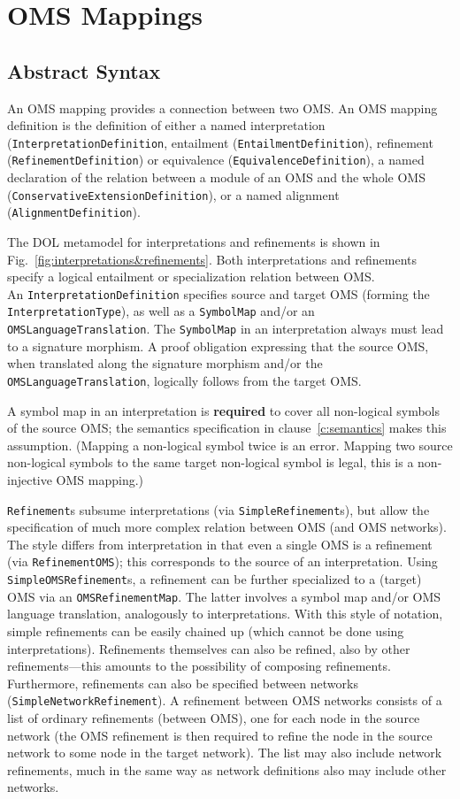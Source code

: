\documentclass[10pt,fleqn,final]{scrreprt}
\newcommand*{\termref}[1]{\index{#1}#1\xspace}
\newcommand*{\syntax}[1]{\texttt{#1}}
\newcommand*{\required}{\textbf{required}\xspace}
\newcommand{\clauserefname}{clause}
\newcommand{\cref}[1]{\clauserefname~\ref{#1}}
\newcommand{\sclause}[1]{\section{#1}}
\newcommand{\ssclause}[1]{\subsection{#1}}
\newenvironment{definitions}[0]{\medskip }{}
\begin{document}
\begin{definitions}


\sclause{OMS Mappings}\label{c:oms-mappings}
\ssclause{Abstract Syntax}


An OMS mapping provides a connection between two OMS. An OMS mapping
definition is the definition of either a named interpretation
(\syntax{InterpretationDefinition}, entailment (\syntax{EntailmentDefinition}),
refinement (\syntax{RefinementDefinition}) or equivalence
(\syntax{EquivalenceDefinition}), a named declaration of the relation
between a module of an OMS and the whole OMS
(\syntax{ConservativeExtensionDefinition}), or a named \termref{alignment}
(\syntax{AlignmentDefinition}).


The DOL metamodel for  interpretations and refinements is shown in 
Fig.~\ref{fig:interpretations&refinements}.
Both interpretations and refinements specify a logical entailment or
specialization relation between OMS.\\
 An
\syntax{InterpretationDefinition} specifies source and target OMS
(forming the \syntax{InterpretationType}), as well as a
\syntax{SymbolMap} and/or an \syntax{OMSLanguageTranslation}.  The
\syntax{SymbolMap} in an interpretation always must lead to a
signature morphism. A proof obligation expressing that the source OMS,
when translated along the signature morphism and/or the
\syntax{OMSLanguageTranslation}, logically follows from the target OMS.

A symbol map in an interpretation is \required to cover all
non-logical symbols of the source OMS; the semantics specification in
\cref{c:semantics} makes this assumption. ({Mapping a non-logical
  symbol twice is an error. Mapping two source non-logical symbols to
  the same target non-logical symbol is legal, this is a non-injective
  OMS mapping.})

\syntax{Refinement}s subsume interpretations (via
\syntax{SimpleRefinement}s), but allow the specification of much more
complex relation between OMS (and OMS networks).  The style differs
from interpretation in that even a single OMS is a refinement (via
\syntax{RefinementOMS}); this corresponds to the source of an
interpretation. Using \syntax{SimpleOMSRefinement}s, a refinement can
be further specialized to a (target) OMS via an
\syntax{OMSRefinementMap}. The latter involves a symbol map and/or OMS
language translation, analogously to interpretations.  With this style
of notation, simple refinements can be easily chained up (which cannot
be done using interpretations).  Refinements themselves can
also be refined, also by other refinements---this amounts
to the possibility of composing refinements. Furthermore,
refinements can also be specified between networks
(\syntax{SimpleNetworkRefinement}).  A refinement between OMS networks
consists of a list of ordinary refinements (between OMS), one for
each node in the source network (the OMS refinement is then required
to refine the node in the source network to some node in the target
network). The list may also include network refinements, much in the
same way as network definitions also may include other networks.


\end{definitions}
\end{document}
